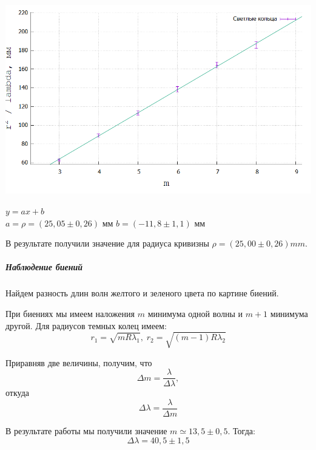 \documentclass[12pt]{article}
\begin{document}
		\vspace{3cm}
		
		\begin{minipage}{.6\textwidth}
			\centering
			\includegraphics[scale=0.6]{light_plot}
		\end{minipage}
		\begin{minipage}{.3\textwidth}
			$y = ax + b$\\
			$a = \rho = (25,05 \pm 0,26)$ мм
			$b = (-11,8 \pm 1,1)$ мм 
		\end{minipage}
		\vspace{2cm}
		
		В результате получили значение для радиуса кривизны $\boxed{\rho = (25,00\pm 0,26) mm}$.
		
		
		\subparagraph{Наблюдение биений}
		
		Найдем разность длин волн желтого и зеленого цвета по картине биений.
		
		При биениях мы имеем наложения $m$ минимума одной волны и $m+1$ минимума другой. Для радиусов темных колец имеем:
		\begin{equation}
			r_1 = \sqrt{mR\lambda_1},\;
			r_2 = \sqrt{(m-1)R\lambda_2}			
		\end{equation}
		
		Приравняв две величины, получим, что $$\Delta m = \dfrac{\lambda}{\Delta \lambda},$$ откуда
		\begin{equation}
		\Delta \lambda = \dfrac{\lambda}{\Delta m}
		\end{equation}
		
		В результате работы мы получили значение $m \simeq 13,5 \pm 0,5$. Тогда:
		$$\boxed{\Delta \lambda = 40,5 \pm 1,5}$$
		
\end{document}
